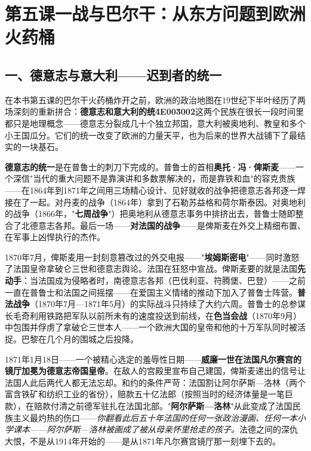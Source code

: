 \documentclass[a4paper,12pt]{ctexart}
\begin{document}
\newpage

\section{\textcolor{orange!80!black}{第五课\quad 一战与巴尔干：从东方问题到欧洲火药桶}}

\subsection*{一、德意志与意大利——迟到者的统一}

在本书第五课的巴尔干火药桶炸开之前，欧洲的政治地图在19世纪下半叶经历了两场深刻的重新拼合：\textbf{德意志和意大利的统\u4E00\u3002}这两个民族在很长一段时间里都只是地理概念——德意志分裂成几十个独立邦国，意大利被奥地利、教皇和多个小王国瓜分。它们的统一改变了欧洲的力量天平，也为后来的世界大战铺下了最结实的一块基石。

\textbf{德意志的统一}是在普鲁士的刺刀下完成的。普鲁士的首相\textbf{奥托·冯·俾斯麦}——一个深信"当代的重大问题不是靠演讲和多数票解决的，而是靠铁和血"的容克贵族——在1864年到1871年之间用三场精心设计、见好就收的战争把德意志各邦逐一焊接在了一起。对丹麦的战争（1864年）拿到了石勒苏益格和荷尔斯泰因。对奥地利的战争（1866年，"\textbf{七周战争}"）把奥地利从德意志事务中排挤出去，普鲁士随即整合了北德意志各邦。最后一场——\textbf{对法国的战争}——是俾斯麦在外交上精细布置、在军事上凶悍执行的杰作。

1870年7月，俾斯麦用一封刻意篡改过的外交电报——"\textbf{埃姆斯密电}"——同时激怒了法国皇帝拿破仑三世和德意志舆论。法国在狂怒中宣战。俾斯麦要的就是法国\textbf{先动手}：当法国成为侵略者时，南德意志各邦（巴伐利亚、符腾堡、巴登）——之前一直在普鲁士和法国之间摇摆——在爱国主义情绪的推动下加入了普鲁士阵营。\textbf{普法战争}（1870年7月—1871年5月）的实际战斗只持续了大约六周。普鲁士的总参谋长毛奇利用铁路把军队以前所未有的速度投送到前线，在\textbf{色当会战}（1870年9月）中包围并俘虏了拿破仑三世本人——一个欧洲大国的皇帝和他的十万军队同时被活捉。巴黎在几个月的围城之后投降。

1871年1月18日——一个被精心选定的羞辱性日期——\textbf{威廉一世在法国凡尔赛宫的镜厅加冕为德意志帝国皇帝}。在敌人的宫殿里宣布自己建国，俾斯麦递出的信号让法国人此后两代人都无法忘却。和约的条件严苛：法国割让阿尔萨斯—洛林（两个富含铁矿和纺织工业的省份），赔款五十亿法郎（按照当时的经济体量是一笔巨款），在赔款付清之前德军驻扎在法国北部。"\textbf{阿尔萨斯—洛林}"从此变成了法国民族主义最灼热的伤口——\textit{你翻看此后五十年法国的任何一张政治漫画、任何一本小学课本——阿尔萨斯—洛林被画成了被从母亲怀里抢走的孩子。}法德之间的深仇大恨，不是从1914年开始的——是从1871年凡尔赛宫镜厅那一刻埋下去的。
\end{document}
